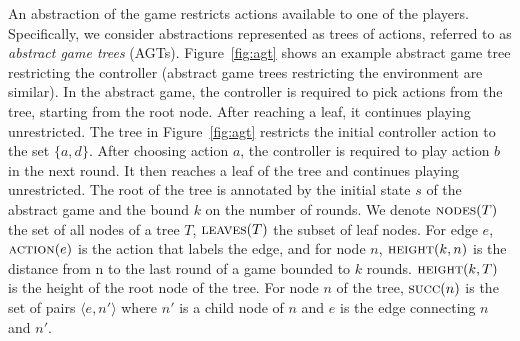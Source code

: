 \documentclass{llncs}
\begin{document}
An abstraction of the game restricts actions available to one of the players.
Specifically, we consider abstractions represented as trees of actions,
referred to as \emph{abstract game trees} (AGTs).  Figure~\ref{fig:agt} shows
an example abstract game tree restricting the controller (abstract game trees
restricting the environment are similar).  In the abstract game, the controller
is required to pick actions from the tree, starting from the root node.  After
reaching a leaf, it continues playing unrestricted.  The tree in
Figure~\ref{fig:agt} restricts the initial controller action to the set $\{a,
d\}$.  After choosing action $a$, the controller is required to play action $b$
in the next round.  It then reaches a leaf of the tree and continues playing
unrestricted.  The root of the tree is annotated by the initial state $s$ of
the abstract game and the bound $k$ on the number of rounds.  We denote
$\textsc{nodes}(T)$ the set of all nodes of a tree $T$, $\textsc{leaves}(T)$
the subset of leaf nodes.  For edge $e$, $\textsc{action}(e)$ is the action
that labels the edge, and for node $n$, $\textsc{height}(k, n)$ is the distance
from n to the last round of a game bounded to $k$ rounds.  $\textsc{height}(k,
T)$ is the height of the root node of the tree.  For node $n$ of the tree,
$\textsc{succ}(n)$ is the set of pairs $\langle e, n' \rangle$ where $n'$ is a
child node of $n$ and $e$ is the edge connecting $n$ and $n'$.
\end{document}
